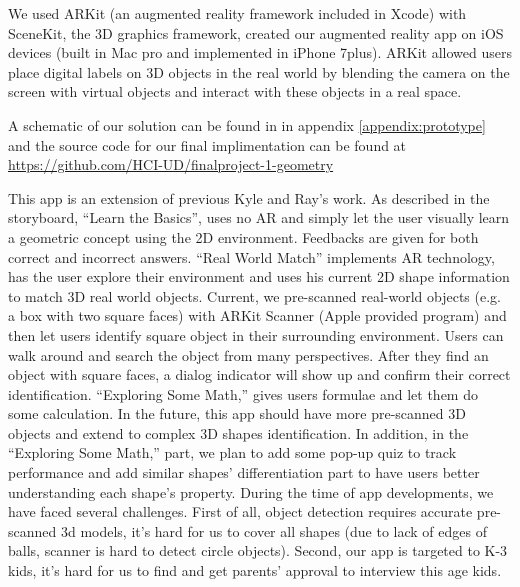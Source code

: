 \documentclass[acmsmall, nonacm]{acmart}
\begin{document}
\replaced
{
  We used ARKit (an augmented reality framework included in Xcode) with SceneKit,
  the 3D graphics framework, created our augmented reality app on iOS devices
  (built in Mac pro and implemented in iPhone 7plus). ARKit allowed users place
  digital labels on 3D objects in the real world by blending the camera on the
  screen with virtual objects and interact with these objects in a real space.

  A schematic of our solution can be found in in appendix
  \ref{appendix:prototype} and the source code for our final implimentation can
  be found at \url{https://github.com/HCI-UD/finalproject-1-geometry }

  This app is an extension of previous Kyle and Ray’s work. As described in the
  storyboard, “Learn the Basics”, uses no AR and simply let the user visually
  learn a geometric concept using the 2D environment. Feedbacks are given for
  both correct and incorrect answers. “Real World Match” implements AR
  technology, has the user explore their environment and uses his current 2D
  shape information to match 3D real world objects. Current, we pre-scanned
  real-world objects (e.g. a box with two square faces) with ARKit Scanner
  (Apple provided program) and then let users identify square object in their
  surrounding environment. Users can walk around and search the object from many
  perspectives. After they find an object with square faces, a dialog indicator
  will show up and confirm their correct identification. “Exploring Some Math,”
  gives users formulae and let them do some calculation. In the future, this app
  should have more pre-scanned 3D objects and extend to complex 3D shapes
  identification. In addition, in the “Exploring Some Math,” part, we plan to
  add some pop-up quiz to track performance and add similar shapes’
  differentiation part to have users better understanding each shape’s property.
  During the time of app developments, we have faced several challenges. First
  of all, object detection requires accurate pre-scanned 3d models, it’s hard
  for us to cover all shapes (due to lack of edges of balls, scanner is hard to
  detect circle objects). Second, our app is targeted to K-3 kids, it’s hard for
  us to find and get parents’ approval to interview this age kids.
}
\end{document}
